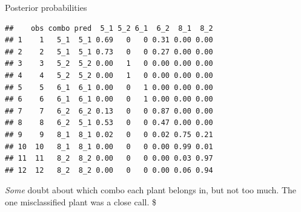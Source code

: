 \documentclass[ignorenonframetext,]{beamer}
\newenvironment{Shaded}{\begin{snugshade}}{\end{snugshade}}
\newcommand{\DataTypeTok}[1]{\textcolor[rgb]{0.13,0.29,0.53}{#1}}
\newcommand{\DecValTok}[1]{\textcolor[rgb]{0.00,0.00,0.81}{#1}}
\newcommand{\KeywordTok}[1]{\textcolor[rgb]{0.13,0.29,0.53}{\textbf{#1}}}
\newcommand{\NormalTok}[1]{#1}
\newcommand{\OperatorTok}[1]{\textcolor[rgb]{0.81,0.36,0.00}{\textbf{#1}}}
\newcommand{\StringTok}[1]{\textcolor[rgb]{0.31,0.60,0.02}{#1}}
\begin{document}
\begin{frame}[fragile]{Posterior probabilities}
\protect\hypertarget{posterior-probabilities-1}{}

\begin{Shaded}
\end{Shaded}

\begin{verbatim}
##    obs combo pred  5_1 5_2 6_1  6_2  8_1  8_2
## 1    1   5_1  5_1 0.69   0   0 0.31 0.00 0.00
## 2    2   5_1  5_1 0.73   0   0 0.27 0.00 0.00
## 3    3   5_2  5_2 0.00   1   0 0.00 0.00 0.00
## 4    4   5_2  5_2 0.00   1   0 0.00 0.00 0.00
## 5    5   6_1  6_1 0.00   0   1 0.00 0.00 0.00
## 6    6   6_1  6_1 0.00   0   1 0.00 0.00 0.00
## 7    7   6_2  6_2 0.13   0   0 0.87 0.00 0.00
## 8    8   6_2  5_1 0.53   0   0 0.47 0.00 0.00
## 9    9   8_1  8_1 0.02   0   0 0.02 0.75 0.21
## 10  10   8_1  8_1 0.00   0   0 0.00 0.99 0.01
## 11  11   8_2  8_2 0.00   0   0 0.00 0.03 0.97
## 12  12   8_2  8_2 0.00   0   0 0.00 0.06 0.94
\end{verbatim}

\emph{Some} doubt about which combo each plant belongs in, but not too
much. The one misclassified plant was a close call. \$

\end{frame}
\end{document}
